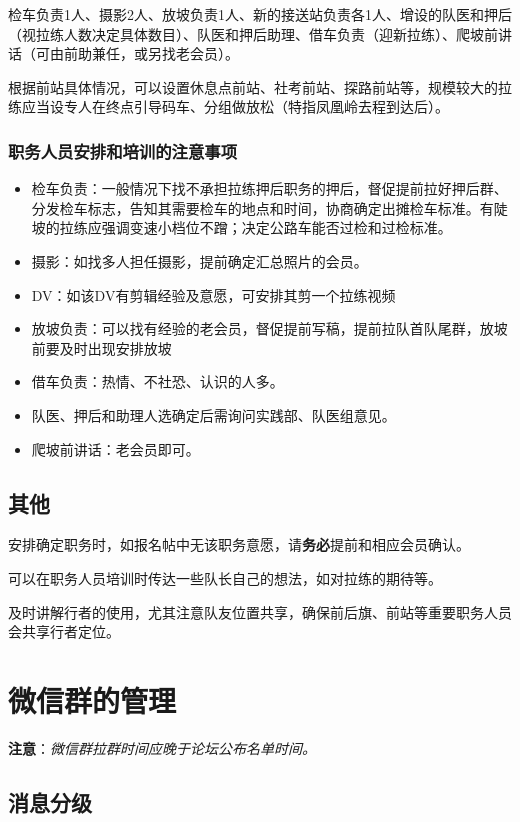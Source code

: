 \documentclass[UTF8]{ctexart}
\begin{document}
检车负责1人、摄影2人、放坡负责1人、新的接送站负责各1人、增设的队医和押后（视拉练人数决定具体数目）、队医和押后助理、借车负责（迎新拉练）、爬坡前讲话（可由前助兼任，或另找老会员）。

根据前站具体情况，可以设置休息点前站、社考前站、探路前站等，规模较大的拉练应当设专人在终点引导码车、分组做放松（特指凤凰岭去程到达后）。

\subsubsection{职务人员安排和培训的注意事项}

\begin{itemize}[nosep,left=2em]
    \item 检车负责：一般情况下找不承担拉练押后职务的押后，督促提前拉好押后群、分发检车标志，告知其需要检车的地点和时间，协商确定出摊检车标准。有陡坡的拉练应强调变速小档位不蹭；决定公路车能否过检和过检标准。
    \item 摄影：如找多人担任摄影，提前确定汇总照片的会员。
    \item DV：如该DV有剪辑经验及意愿，可安排其剪一个拉练视频
    \item 放坡负责：可以找有经验的老会员，督促提前写稿，提前拉队首队尾群，放坡前要及时出现安排放坡
    \item 借车负责：热情、不社恐、认识的人多。
    \item 队医、押后和助理人选确定后需询问实践部、队医组意见。
    \item 爬坡前讲话：老会员即可。
\end{itemize}

\subsection{其他}

安排确定职务时，如报名帖中无该职务意愿，请\textbf{务必}提前和相应会员确认。

可以在职务人员培训时传达一些队长自己的想法，如对拉练的期待等。

及时讲解行者的使用，尤其注意队友位置共享，确保前后旗、前站等重要职务人员会共享行者定位。

\section{微信群的管理}
\textbf{注意}：\textit{微信群拉群时间应晚于论坛公布名单时间。}

\subsection{消息分级}
\end{document}
